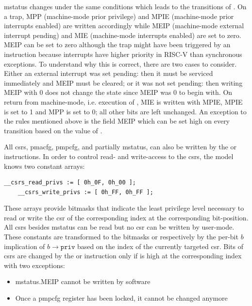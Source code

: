 \gls{mstatus} changes under the same conditions which leads to the transitions of .
On a trap, MPP (machine-mode prior privilege) and MPIE (machine-mode prior interrupts enabled) are written accordingly while MEIP (machine-mode external interrupt pending) and MIE (machine-mode interrupts enabled) are set to zero.
MEIP can be set to zero although the trap might have been triggered by an  instruction because interrupts have higher priority in RISC-V than synchronous exceptions.
To understand why this is correct, there are two cases to consider.
Either an external interrupt was set pending: then it must be serviced immediately and MEIP must be cleared; or it was not set pending: then writing MEIP with 0 does not change the state since MEIP was 0 to begin with.
On return from machine-mode, i.e. execution of , MIE is written with MPIE, MPIE is set to 1 and MPP is set to 0; all other bits are left unchanged.
An exception to the rules mentioned above is the field MEIP which can be set high on every transition based on the value of .

All \glspl{csr}, \gls{pmacfg}, \gls{pmpcfg}, and partially \gls{mstatus}, can also be written by the  or  instructions.
In order to control read- and write-access to the \glspl{csr}, the model knows two constant arrays:
\begin{lstlisting}[language=smv]
    __csrs_read_privs := [ 0h_0F, 0h_00 ];
    __csrs_write_privs := [ 0h_FF, 0h_FF ];
\end{lstlisting}

These arrays provide bitmasks that indicate the least privilege level necessary to read or write the \gls{csr} of the corresponding index at the corresponding bit-position.
All \glspl{csr} besides \gls{mstatus} can be read but no \gls{csr} can be written by user-mode.
These constants are transformed to the bitmasks  or  respectively by the per-bit $ b $ implication of $ b \rightarrow \texttt{priv} $ based on the index of the currently targeted \gls{csr}.
Bits of \glspl{csr} are changed by the  or  instruction only if  is high at the corresponding index with two exceptions:
\begin{itemize}
    \item \gls{mstatus}.MEIP cannot be written by software
    \item Once a \gls{pmpcfg} register has been locked, it cannot be changed anymore
\end{itemize}


